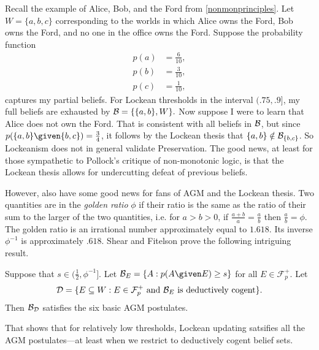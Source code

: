 Recall the example of Alice, Bob, and the Ford from \autoref{nonmonprinciples}.
Let $W=\{a, b, c\}$ corresponding to the worlds in which Alice owns the Ford,
Bob owns the Ford, and no one in the office owns the Ford.  Suppose the
probability function
$$
\begin{aligned}
  p(a) &= \frac{6}{10},\\
  p(b) &= \frac{3}{10},\\
  p(c) &= \frac{1}{10},
\end{aligned}
$$
captures my partial beliefs. For Lockean thresholds in the interval $(.75,.9]$,
my full beliefs are exhausted by $\mathcal{B}=\{ \{a,b\}, W\}.$ Now suppose I were to
learn  that Alice does not own the Ford. That is consistent with all beliefs in
$\mathcal{B}$, but since $p(\{a,b\} \given \{b,c\}) = \frac{3}{4}$, it follows by the
Lockean thesis that $\{a,b\} \notin \mathcal{B}_{\{b,c\}}$. So Lockeanism does not in
general validate Preservation. The good news, at least for those sympathetic to
Pollock's critique of non-monotonic logic, is that the Lockean thesis allows for
undercutting defeat of previous beliefs.

However, \citet{shear2018two} also have some good news for fans of AGM and the
Lockean thesis. Two quantities are in the {\em golden ratio} $\phi$ if their
ratio is the same as the ratio of their sum to the larger of the two quantities,
i.e. for $a>b>0$, if $\frac{a+b}{a} = \frac{a}{b}$ then $\frac{a}{b} = \phi$.
The golden ratio is an irrational number approximately equal to $1.618.$ Its
inverse $\phi^{-1}$ is approximately $.618.$ Shear and Fitelson prove the
following intriguing result.
\begin{theorem}
Suppose that $s\in (\frac{1}{2}, \phi^{-1}]$. Let $\cb_E = \{ A : p(A \given E)
\geq s\}$ for all $E\in\mathcal{F}_p^+$. Let $$\mathcal{D}=\{E\subseteq W :
E\in\mathcal{F}_p^+ \text{ and } \mathcal{B}_E \text{ is deductively cogent} \}.$$ Then
$\mathcal{B}_{\mathcal{D}}$ satisfies the six basic AGM postulates.
\end{theorem}
That shows that for relatively low thresholds, Lockean updating satsifies all
the AGM postulates---at least when we restrict to deductively cogent belief
sets.


